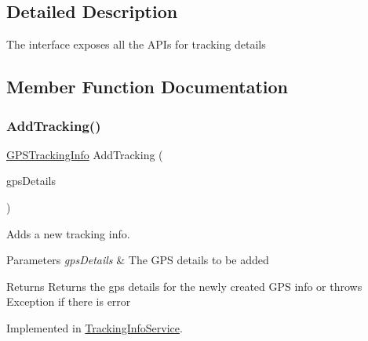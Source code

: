 \subsection{Detailed Description}
The interface exposes all the A\+P\+Is for tracking details 



\subsection{Member Function Documentation}
\mbox{\label{interfaceWildLifeTracker_1_1Services_1_1ITrackingInfoService_a25bb0b990b8fd5649a97a10d14faecd2}} 
\subsubsection{\texorpdfstring{Add\+Tracking()}{AddTracking()}}
{\footnotesize\ttfamily \hyperlink{classWildLifeTracker_1_1Models_1_1GPSTrackingInfo}{G\+P\+S\+Tracking\+Info} Add\+Tracking (\begin{DoxyParamCaption}\item[{\hyperlink{classWildLifeTracker_1_1Models_1_1GPSTrackingInfo}{G\+P\+S\+Tracking\+Info}}]{gps\+Details }\end{DoxyParamCaption})}



Adds a new tracking info. 
\begin{DoxyParams}{Parameters}
{\em gps\+Details} & The G\+PS details to be added\\
\hline
\end{DoxyParams}
\begin{DoxyReturn}{Returns}
Returns the gps details for the newly created G\+PS info or throws Exception if there is error
\end{DoxyReturn}




Implemented in \hyperlink{classWildLifeTracker_1_1Services_1_1TrackingInfoService_a25bb0b990b8fd5649a97a10d14faecd2}{Tracking\+Info\+Service}.

\mbox{\label{interfaceWildLifeTracker_1_1Services_1_1ITrackingInfoService_a858073f81f74fcdf93b69fe464b13e84}} 
